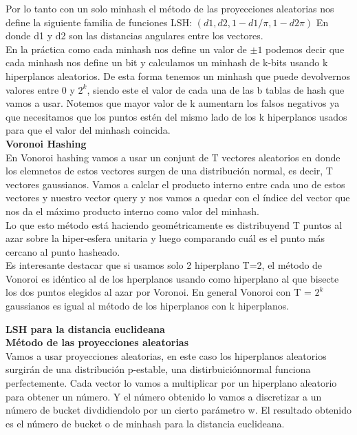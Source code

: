 \documentclass[titlepage,a4paper]{article}
\begin{document}
 Por lo tanto con un solo minhash el método de las proyecciones aleatorias nos define la siguiente familia de funciones LSH: $(d1, d2, 1-d1/\pi , 1-d2\pi)$ En donde d1 y d2 son las distancias angulares entre los vectores. \\
 
 En la práctica como cada minhash nos define un valor de $\pm 1$ podemos decir que cada minhash nos define un bit y calculamos un minhash de k-bits usando k hiperplanos aleatorios. De esta forma tenemos un minhash que puede devolvernos valores entre 0 y $2^k$, siendo este el valor de cada una de las b tablas de hash que vamos a usar. Notemos que mayor valor de k aumentarn los falsos negativos ya que necesitamos que los puntos estén del mismo lado de los k hiperplanos usados para que el valor del minhash coincida. \\
 
 \textbf{Voronoi Hashing}\\
 
 En Vonoroi hashing vamos a usar un conjunt de T vectores aleatorios en donde los elemnetos de estos vectores surgen de una distribución normal, es decir, T vectores gaussianos. Vamos a calclar el producto interno entre cada uno de estos vectores y nuestro vector query y nos vamos a quedar con el índice del vector que nos da el máximo producto interno como valor del minhash.  \\
 
Lo que esto método está haciendo geométricamente es distribuyend T puntos al azar sobre la hiper-esfera unitaria y luego comparando cuál es el punto más cercano al punto hasheado. \\

Es interesante destacar que si usamos solo 2 hiperplano T=2, el método de Vonoroi es idéntico al de los hperplanos usando como hiperplano al que bisecte los dos puntos elegidos al azar por Voronoi. En general Vonoroi con T = $2^k$ gaussianos es igual al método de los hiperplanos con k hiperplanos. 
 
 
\textbf{LSH para la distancia euclideana }\\

\textbf{Método de las proyecciones aleatorias}\\

Vamos a usar proyecciones aleatorias, en este caso los hiperplanos aleatorios surgirán de una distribución p-estable, una distirbuiciónnormal funciona perfectemente. Cada vector lo vamos a multiplicar por un hiperplano aleatorio para obtener un número. Y el número obtenido lo vamos a discretizar a un número de bucket divdidiendolo por un cierto parámetro w. El resultado obtenido es el número de bucket o de minhash para la distancia euclideana. \\
\end{document}
